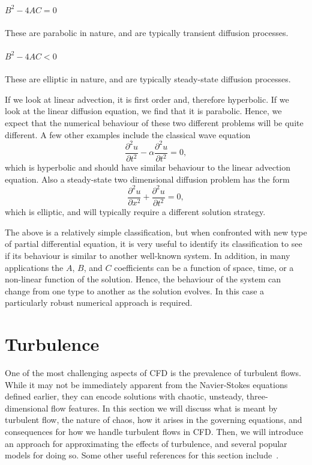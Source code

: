 \subsubsection{$B^2-4AC = 0$}
These are parabolic in nature, and are typically transient diffusion processes.

\subsubsection{$B^2-4AC < 0$}
These are elliptic in nature, and are typically steady-state diffusion processes.

If we look at linear advection, it is first order and, therefore hyperbolic. If we look at the linear diffusion equation, we find that it is parabolic. Hence, we expect that the numerical behaviour of these two different problems will be quite different. A few other examples include the classical wave equation
\begin{equation}
	\frac{\partial^2 u}{\partial t^2} - \alpha\frac{\partial^2 u}{\partial t^2} = 0,
\end{equation}
which is hyperbolic and should have similar behaviour to the linear advection equation. Also a steady-state two dimensional diffusion problem has the form
\begin{equation}
	\frac{\partial^2 u}{\partial x^2} + \frac{\partial^2 u}{\partial t^2} = 0,
\end{equation}
which is elliptic, and will typically require a different solution strategy.

The above is a relatively simple classification, but when confronted with new type of partial differential equation, it is very useful to identify its classification to see if its behaviour is similar to another well-known system. In addition, in many applications the $A$, $B$, and $C$ coefficients can be a function of space, time, or a non-linear function of the solution. Hence, the behaviour of the system can change from one type to another as the solution evolves. In this case a particularly robust numerical approach is required.
 
\chapter{Turbulence}
One of the most challenging aspects of CFD is the prevalence of turbulent flows. While it may not be immediately apparent from the Navier-Stokes equations defined earlier, they can encode solutions with chaotic, unsteady, three-dimensional flow features. In this section we will discuss what is meant by turbulent flow, the nature of chaos, how it arises in the governing equations, and consequences for how we handle turbulent flows in CFD. Then, we will introduce an approach for approximating the effects of turbulence, and several popular models for doing so. Some other useful references for this section include~\cite{pope2001turbulent, davidson2015turbulence}.

